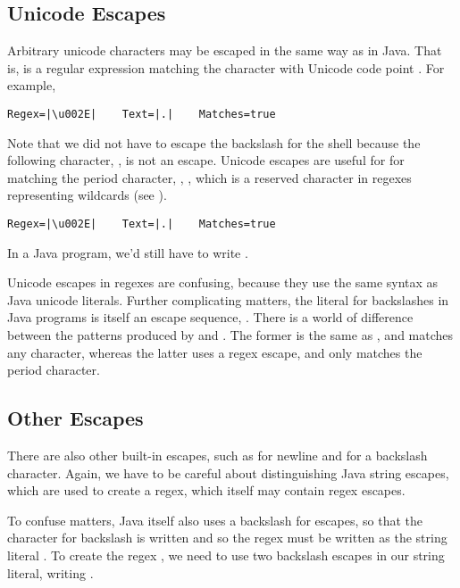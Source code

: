 \subsection{Unicode Escapes}

Arbitrary unicode characters may be escaped in the same way as in
Java.  That is,  is a regular expression
matching the character with Unicode code point
.  For example,
%
%
\begin{verbatim}
Regex=|\u002E|    Text=|.|    Matches=true
\end{verbatim}
%
Note that we did not have to escape the backslash for the shell
because the following character, , is not an escape.  Unicode
escapes are useful for for matching the period character,
, , which is a reserved character
in regexes representing wildcards (see ).
%
%
\begin{verbatim}
Regex=|\u002E|    Text=|.|    Matches=true
\end{verbatim}
%

In a Java program, we'd still have to write
.  

Unicode escapes in regexes are confusing, because they use the same
syntax as Java unicode literals.  Further complicating matters, the
literal for backslashes in Java programs is itself an escape sequence,
\code{{\bk}{\bk}}.  There is a world of difference between the
patterns produced by  and
.  The former is the same
as , and matches any character, whereas
the latter uses a regex escape, and only matches the period
character.

\subsection{Other Escapes}

There are also other built-in escapes, such as  for
newline and \code{\bk\bk} for a backslash character.  Again, we have
to be careful about distinguishing Java string escapes, which are used
to create a regex, which itself may contain regex escapes.  

To confuse matters, Java itself also uses a backslash for escapes, so
that the character for backslash is written  and so the
regex  must be written as the string literal
.  To create the regex \code{\bk\bk}, we need to use
two backslash escapes in our string literal, writing
.  

